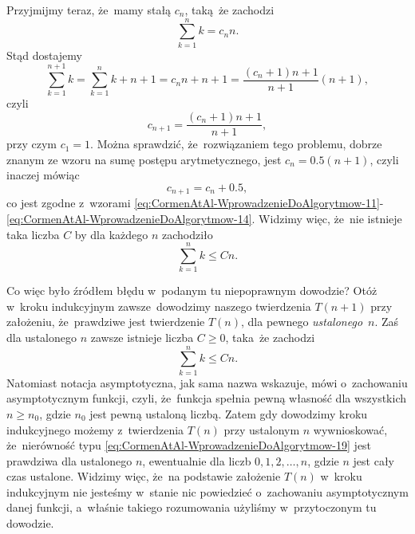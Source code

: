 \documentclass[a4paper,11pt]{article}
\numberwithin{equation}{section}
\begin{document}
Przyjmijmy teraz, że~mamy stałą $c_{ n }$, taką~że zachodzi
\begin{equation}
  \label{eq:CormenAtAl-WprowadzenieDoAlgorytmow-15}
  \sum_{ k = 1 }^{ n } k = c_{ n } n.
\end{equation}
Stąd dostajemy
\begin{equation}
  \label{eq:CormenAtAl-WprowadzenieDoAlgorytmow-16}
  \sum_{ k = 1 }^{ n + 1 } k = \sum_{ k = 1 }^{ n } k + n + 1 = c_{ n } n + n + 1 =
  \frac{ ( c_{ n } + 1 ) n + 1 }{ n + 1 } ( n + 1 ),
\end{equation}
czyli
\begin{equation}
  \label{eq:CormenAtAl-WprowadzenieDoAlgorytmow-17}
  c_{ n + 1 } = \frac{ ( c_{ n } + 1 ) n + 1 }{ n + 1 },
\end{equation}
przy czym $c_{ 1 } = 1$. Można sprawdzić, że~rozwiązaniem tego problemu,
dobrze znanym ze wzoru na sumę postępu arytmetycznego, jest
$c_{ n } = 0.5 ( n + 1 )$, czyli inaczej mówiąc
\begin{equation}
  \label{eq:CormenAtAl-WprowadzenieDoAlgorytmow-18}
  c_{ n + 1 } = c_{ n } + 0.5,
\end{equation}
co jest zgodne z~wzorami
\eqref{eq:CormenAtAl-WprowadzenieDoAlgorytmow-11}-\eqref{eq:CormenAtAl-WprowadzenieDoAlgorytmow-14}.
Widzimy więc, że~nie istnieje taka liczba $C$ by dla każdego $n$ zachodziło
\begin{equation}
  \label{eq:CormenAtAl-WprowadzenieDoAlgorytmow-19}
  \sum_{ k = 1 }^{ n } k \leq C n.
\end{equation}

Co więc było źródłem błędu w~podanym tu niepoprawnym dowodzie? Otóż w~kroku
indukcyjnym zawsze~dowodzimy naszego twierdzenia $T( n + 1 )$ przy
założeniu, że~prawdziwe jest twierdzenie $T( n )$, dla pewnego
\textit{ustalonego}~$n$. Zaś dla ustalonego $n$ zawsze istnieje liczba
$C \geq 0$, taka~że zachodzi
\begin{equation}
  \label{eq:CormenAtAl-WprowadzenieDoAlgorytmow-20}
  \sum_{ k = 1 }^{ n } k \leq C n.
\end{equation}
Natomiast notacja asymptotyczna, jak sama nazwa wskazuje, mówi o~zachowaniu
asymptotycznym funkcji, czyli, że~funkcja spełnia pewną własność dla
wszystkich $n \geq n_{ 0 }$, gdzie $n_{ 0 }$ jest pewną ustaloną liczbą. Zatem
gdy dowodzimy kroku indukcyjnego możemy z~twierdzenia $T( n )$ przy
ustalonym $n$ wywnioskować, że~nierówność typu
\eqref{eq:CormenAtAl-WprowadzenieDoAlgorytmow-19} jest prawdziwa dla
ustalonego $n$, ewentualnie dla liczb $0, 1, 2, \ldots, n$, gdzie $n$ jest
cały czas ustalone. Widzimy więc, że~na podstawie założenie $T( n )$
w~kroku indukcyjnym nie jesteśmy w~stanie nic powiedzieć o~zachowaniu
asymptotycznym danej funkcji, a~właśnie takiego rozumowania użyliśmy
w~przytoczonym tu dowodzie.
\end{document}
